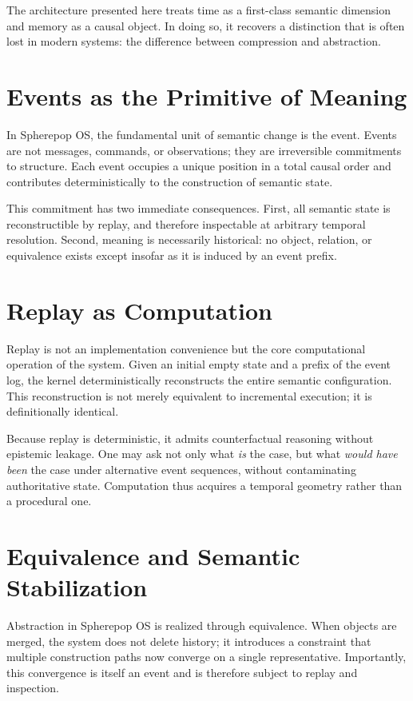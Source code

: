 The architecture presented here treats time as a first-class semantic dimension and memory as a causal object. In doing so, it recovers a distinction that is often lost in modern systems: the difference between compression and abstraction.

\section{Events as the Primitive of Meaning}

In Spherepop OS, the fundamental unit of semantic change is the event. Events are not messages, commands, or observations; they are irreversible commitments to structure. Each event occupies a unique position in a total causal order and contributes deterministically to the construction of semantic state.

This commitment has two immediate consequences. First, all semantic state is reconstructible by replay, and therefore inspectable at arbitrary temporal resolution. Second, meaning is necessarily historical: no object, relation, or equivalence exists except insofar as it is induced by an event prefix.

\section{Replay as Computation}

Replay is not an implementation convenience but the core computational operation of the system. Given an initial empty state and a prefix of the event log, the kernel deterministically reconstructs the entire semantic configuration. This reconstruction is not merely equivalent to incremental execution; it is definitionally identical.

Because replay is deterministic, it admits counterfactual reasoning without epistemic leakage. One may ask not only what \emph{is} the case, but what \emph{would have been} the case under alternative event sequences, without contaminating authoritative state. Computation thus acquires a temporal geometry rather than a procedural one.

\section{Equivalence and Semantic Stabilization}

Abstraction in Spherepop OS is realized through equivalence. When objects are merged, the system does not delete history; it introduces a constraint that multiple construction paths now converge on a single representative. Importantly, this convergence is itself an event and is therefore subject to replay and inspection.

